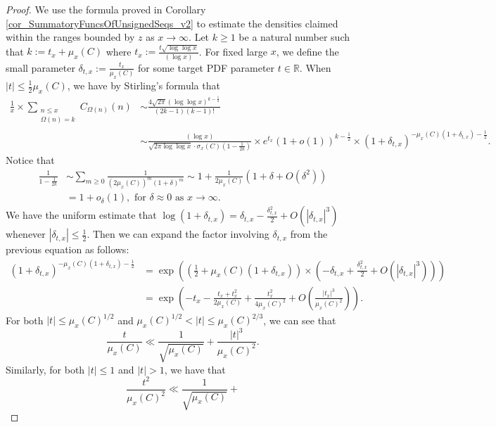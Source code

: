 \documentclass[11pt,reqno,a4letter]{article}
\numberwithin{figure}{section}
\numberwithin{table}{section}
\theoremstyle{plain}
\numberwithin{theorem}{section}
\theoremstyle{definition}
\begin{document}
\begin{proof}
We use the formula proved in Corollary \ref{cor_SummatoryFuncsOfUnsignedSeqs_v2} 
to estimate the densities claimed within the ranges bounded by 
$z$ as $x \rightarrow \infty$. 
Let $k \geq 1$ be a natural number such that $k := t_x + \mu_x(C)$ where 
$t_x := \frac{t \sqrt{\log\log x}}{(\log x)}$. 
For fixed large $x$, we define the small parameter $\delta_{t,x} := \frac{t_x}{\mu_x(C)}$ 
for some target PDF parameter $t \in \mathbb{R}$. 
When $|t| \leq \frac{1}{2} \mu_x(C)$, we have by Stirling's formula that 
\begin{align*} 
\frac{1}{x} \times \sum_{\substack{n \leq x \\ \Omega(n)=k}} C_{\Omega(n)}(n) & 
     \sim 
     \frac{4\sqrt{2\pi} (\log\log x)^{k-\frac{1}{2}}}{(2k-1) (k-1)!} \\ 
     & \sim 
     \frac{(\log x)}{\sqrt{2\pi \log\log x} \cdot \sigma_x(C)  
     \left(1-\frac{1}{2k}\right)} \times e^{t_x} (1+o(1))^{k-\frac{1}{2}} \times 
     \left(1+\delta_{t,x}\right)^{-\mu_x(C)(1+\delta_{t,x})-\frac{1}{2}}. 
\end{align*} 
Notice that 
\begin{align*}
\frac{1}{1-\frac{1}{2k}} & \sim \sum_{m \geq 0} \frac{1}{(2 \mu_x(C))^m (1+\delta)^m} 
     \sim 1 + \frac{1}{2 \mu_x(C)} \left(1+\delta+O(\delta^2)\right) \\ 
     & = 1 + o_{\delta}(1), \text{\ for\ } \delta \approx 0 \text{\ as\ } x \rightarrow \infty. 
\end{align*}
We have the uniform estimate that 
$\log(1+\delta_{t,x}) = \delta_{t,x} - \frac{\delta_{t,x}^2}{2} + O(|\delta_{t,x}|^3)$ whenever 
$|\delta_{t,x}| \leq \frac{1}{2}$. Then we can expand the factor involving $\delta_{t,x}$ 
from the previous equation as follows: 
\begin{align*} 
(1+\delta_{t,x})^{-\mu_x(C) (1+\delta_{t,x}) - \frac{1}{2}} & = 
     \exp\left(\left(\frac{1}{2}+\mu_x(C) (1+\delta_{t,x})\right) \times 
     \left(-\delta_{t,x} + \frac{\delta_{t,x}^2}{2} + O(|\delta_{t,x}|^3)\right)\right) \\ 
     & = \exp\left(-t_x - \frac{t_x+t_x^2}{2\mu_x(C)} + \frac{t_x^2}{4\mu_x(C)^2} + 
     O\left(\frac{|t_x|^3}{\mu_x(C)^2}\right)\right). 
\end{align*} 
For both $|t| \leq \mu_x(C)^{1/2}$ and 
$\mu_x(C)^{1/2} < |t| \leq \mu_x(C)^{2/3}$, 
we can see that 
\[
\frac{t}{\mu_x(C)} \ll \frac{1}{\sqrt{\mu_x(C)}} + \frac{|t|^3}{\mu_x(C)^2}. 
\]
Similarly, for both  $|t| \leq 1$ and $|t| > 1$, we have that 
\[
\frac{t^2}{\mu_x(C)^2} \ll \frac{1}{\sqrt{\mu_x(C)}} + 
\]
\end{proof}
\end{document}
